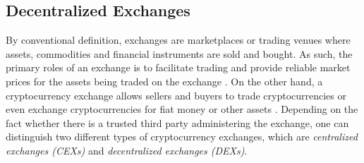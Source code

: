 \subsection{Decentralized Exchanges}


By conventional definition, exchanges are marketplaces or trading venues where assets, commodities and financial instruments are sold and bought. As such, the primary roles of an exchange is to facilitate trading and provide reliable market prices for the assets being traded on the exchange \cite{investopediaExchangeDef, wikiExchangeDef}. On the other hand, a cryptocurrency exchange allows sellers and buyers to  trade cryptocurrencies or even exchange cryptocurrencies for fiat money or other assets \cite{wikiCryptoExchange}. Depending on the fact whether there is a trusted third party administering the exchange, one can distinguish two different types of cryptocurrency exchanges, which are \textit{centralized exchanges (CEXs)} and \textit{decentralized exchanges (DEXs)}. 

